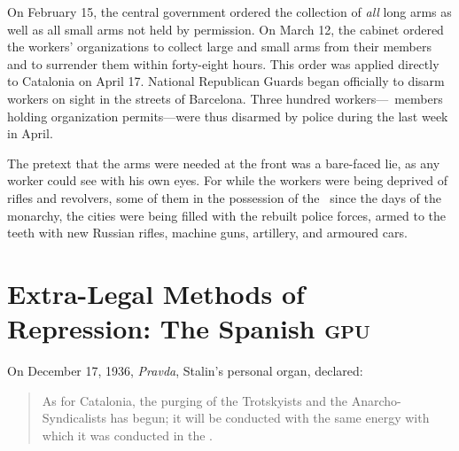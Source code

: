 On February 15, the central government ordered the collection of \emph{all} long arms as well as all small arms not held by permission. On March 12, the cabinet ordered the workers’ organizations to collect large and small arms from their members and to surrender them within forty-eight hours. This order was applied directly to Catalonia on April 17. National Republican Guards began officially to disarm workers on sight in the streets of Barcelona. Three hundred workers---\CNT\ members holding organization permits---were thus disarmed by police during the last week in April.

The pretext that the arms were needed at the front was a bare-faced lie, as any worker could see with his own eyes. For while the workers were being deprived of rifles and revolvers, some of them in the possession of the \CNT\ since the days of the monarchy, the cities were being filled with the rebuilt police forces, armed to the teeth with new Russian rifles, machine guns, artillery, and armoured cars.

\section[Extra-Legal Methods of Repression]{Extra-Legal Methods of Repression: The Spanish \textsc{gpu}}

On December 17, 1936, \emph{Pravda}, Stalin’s personal organ, declared:

\begin{quotation}
  As for Catalonia, the purging of the Trotskyists and the Anarcho-Syndicalists has begun; it will be conducted with the same energy with which it was conducted in the \USSR.
\end{quotation}

